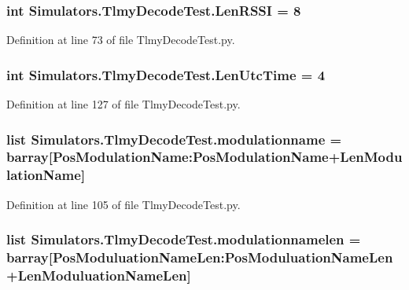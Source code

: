 \subsubsection[{Len\+R\+S\+S\+I}]{\setlength{\rightskip}{0pt plus 5cm}int Simulators.\+Tlmy\+Decode\+Test.\+Len\+R\+S\+S\+I = 8}\label{namespace_simulators_1_1_tlmy_decode_test_a4230750d2f14e6c0b61c49139afea479}


Definition at line 73 of file Tlmy\+Decode\+Test.\+py.

\hypertarget{namespace_simulators_1_1_tlmy_decode_test_ad5b0247967c08e0d7635ddddf22a76c3}{}
\subsubsection[{Len\+Utc\+Time}]{\setlength{\rightskip}{0pt plus 5cm}int Simulators.\+Tlmy\+Decode\+Test.\+Len\+Utc\+Time = 4}\label{namespace_simulators_1_1_tlmy_decode_test_ad5b0247967c08e0d7635ddddf22a76c3}


Definition at line 127 of file Tlmy\+Decode\+Test.\+py.

\hypertarget{namespace_simulators_1_1_tlmy_decode_test_ad8b5f4b2ce7a6876c0832d15d6015186}{}
\subsubsection[{modulationname}]{\setlength{\rightskip}{0pt plus 5cm}list Simulators.\+Tlmy\+Decode\+Test.\+modulationname = {\bf barray}\mbox{[}Pos\+Modulation\+Name\+:\+Pos\+Modulation\+Name+{\bf Len\+Modulation\+Name}\mbox{]}}\label{namespace_simulators_1_1_tlmy_decode_test_ad8b5f4b2ce7a6876c0832d15d6015186}


Definition at line 105 of file Tlmy\+Decode\+Test.\+py.

\hypertarget{namespace_simulators_1_1_tlmy_decode_test_a86a6413ce18f4a4b2f3358ab2a48a6f8}{}
\subsubsection[{modulationnamelen}]{\setlength{\rightskip}{0pt plus 5cm}list Simulators.\+Tlmy\+Decode\+Test.\+modulationnamelen = {\bf barray}\mbox{[}Pos\+Moduluation\+Name\+Len\+:\+Pos\+Moduluation\+Name\+Len+{\bf Len\+Moduluation\+Name\+Len}\mbox{]}}\label{namespace_simulators_1_1_tlmy_decode_test_a86a6413ce18f4a4b2f3358ab2a48a6f8}


